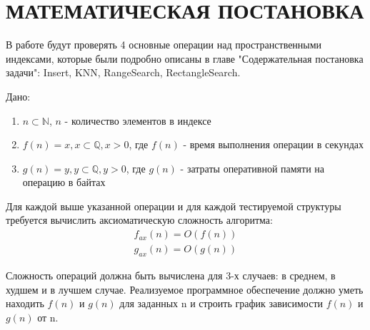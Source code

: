\chapter{МАТЕМАТИЧЕСКАЯ ПОСТАНОВКА}
\label{cha:math}

В работе будут проверять 4 основные операции над пространственными индексами, которые были подробно описаны в главе "Содержательная постановка задачи": Insert, KNN, RangeSearch, RectangleSearch.

Дано:
\begin{enumerate}
    \item $n \subset \mathbb{N}$, $n$ - количество элементов в индексе
    \item $f(n) = x, x \subset  \mathbb{Q}, x > 0$, где $f(n)$ - время выполнения операции в секундах
    \item $g(n) = y, y \subset  \mathbb{Q}, y > 0$, где $g(n)$ - затраты оперативной памяти на операцию в байтах
\end{enumerate}
Для каждой выше указанной операции и для каждой тестируемой структуры требуется вычислить аксиоматическую сложность алгоритма:
\begin{align}
    f_{ax}(n) = O(f(n)) \\
    g_{ax}(n) = O(g(n))
\end{align}

Сложность операций должна быть вычислена для 3-х случаев: в среднем, в худшем и в лучшем случае.
Реализуемое программное обеспечение должно уметь находить $f(n)$ и $g(n)$ для заданных n и строить график зависимости $f(n)$ и $g(n)$ от n.
